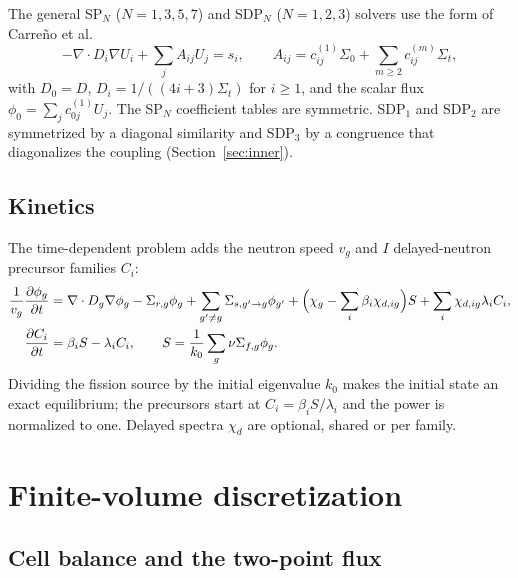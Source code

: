 \documentclass[a4paper,10pt]{article}
\begin{document}
The general SP$_N$ ($N = 1, 3, 5, 7$) and SDP$_N$ ($N = 1, 2, 3$) solvers use the
form of Carre\~no et al.~\cite{carreno2024}
\begin{equation}
-\nabla\cdot D_i\nabla U_i + \sum_j A_{ij}U_j = s_i,\qquad
A_{ij} = c^{(1)}_{ij}\Sigma_0 + \sum_{m\ge2}c^{(m)}_{ij}\Sigma_t,
\end{equation}
with $D_0 = D$, $D_i = 1/((4i+3)\Sigma_t)$ for $i\ge1$, and the scalar flux
$\phi_0 = \sum_j c^{(1)}_{0j}U_j$. The SP$_N$ coefficient tables are symmetric.
SDP$_1$ and SDP$_2$ are symmetrized by a diagonal similarity and SDP$_3$ by a
congruence that diagonalizes the coupling (Section~\ref{sec:inner}).

\subsection{Kinetics}

The time-dependent problem adds the neutron speed $v_g$ and $I$ delayed-neutron
precursor families $C_i$:
\begin{align}
\frac{1}{v_g}\frac{\partial\phi_g}{\partial t} &= \nabla\cdot D_g\nabla\phi_g
  - \Sigma_{r,g}\phi_g + \sum_{g'\ne g}\Sigma_{s,g'\to g}\phi_{g'}
  + \Bigl(\chi_g - \sum_i\beta_i\chi_{d,ig}\Bigr)S
  + \sum_i\chi_{d,ig}\lambda_iC_i,\\
\frac{\partial C_i}{\partial t} &= \beta_iS - \lambda_iC_i,\qquad
S = \frac{1}{k_0}\sum_g\nu\Sigma_{f,g}\phi_g .
\end{align}
Dividing the fission source by the initial eigenvalue $k_0$ makes the initial
state an exact equilibrium; the precursors start at $C_i = \beta_iS/\lambda_i$
and the power is normalized to one. Delayed spectra $\chi_{d}$ are optional,
shared or per family.

\section{Finite-volume discretization}
\label{sec:discretization}

\subsection{Cell balance and the two-point flux}
\end{document}
